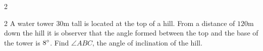 \begin{description}
\begin {multicols}{2}
\item    
\setlength\fboxrule{0in}\setlength\fboxsep{0.2in}
\end {multicols}
 

\item [31.]
\columnsep =30pt
\begin {multicols}{2}
 A water tower $30 \mbox{m}$ tall is located at the top of a hill. From
a distance of $120 \mbox{m}$ down the hill it is observer that the angle formed between the top and
the base of the tower is $8 \mbox{{\ensuremath{{}^\circ}}}$. Find $\angle ABC\text{,}$ the angle of inclination of the hill. 

\item    
\setlength\fboxrule{0in}\setlength\fboxsep{0.2in}
\end {multicols}
 \end{description}

